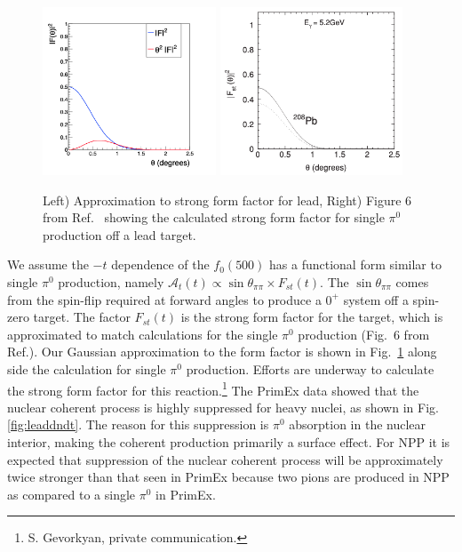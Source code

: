 \begin{figure}[tbh]
\begin{center}
\includegraphics[height=5cm,clip=true]{figures/fit_Primakoff_sigma_c1.png}
\includegraphics[height=5cm,clip=true]{figures/PRC80_2009_Fig6.png}
\caption{ Left) Approximation to strong form factor for lead, Right) Figure 6 from Ref.~\cite{Gevorkyan:2009ge} showing the calculated strong form factor for single $\pi^0$ production off a lead target.
\label{fig:strongFF}}
\end{center}
\end{figure}

We assume the $-t$ dependence of the $f_0(500)$ has a
functional form similar to single $\pi^0$ production, namely $\mathcal{A}_t(t)
\propto \sin{\theta_{\pi\pi}} \times F_{st}(t)$.  The
$\sin{\theta_{\pi\pi}}$ comes from the spin-flip required at forward
angles to produce a $0^+$ system off a spin-zero target. The factor
$F_{st}(t)$ is the strong form factor for the target, which is
approximated to match calculations for the single $\pi^0$ production
(Fig.~6 from Ref.\cite{Gevorkyan:2009ge}). Our Gaussian approximation
to the form factor is shown in Fig.~\ref{fig:strongFF} along side the
calculation for single $\pi^0$ production. Efforts are underway to
calculate the strong form factor for this
reaction.\footnote{S. Gevorkyan, private communication.}  The PrimEx
data showed that the nuclear coherent process is highly suppressed for
heavy nuclei, as shown in Fig.\ref{fig:leaddndt}.  The reason for this
suppression is $\pi^0$ absorption in the nuclear interior, making the
coherent production primarily a surface effect.  For NPP it is
expected that suppression of the nuclear coherent process will be
approximately twice stronger than that seen in PrimEx because two
pions are produced in NPP as compared to a single $\pi^0$ in PrimEx.

